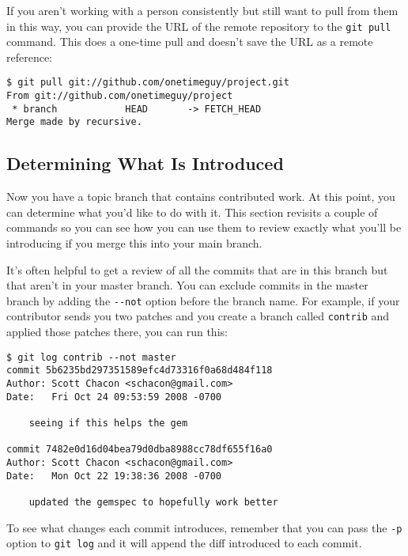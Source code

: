 \documentclass[a4paper]{book}
\begin{document}
If you aren't working with a person consistently but still want to pull from them in this way, you can provide the URL of the remote repository to the \texttt{git pull} command. This does a one-time pull and doesn't save the URL as a remote reference:

\begin{shaded}\begin{verbatim}
$ git pull git://github.com/onetimeguy/project.git
From git://github.com/onetimeguy/project
 * branch            HEAD       -> FETCH_HEAD
Merge made by recursive.
\end{verbatim}\end{shaded}

\subsection{Determining What Is Introduced}\label{determining-what-is-introduced}

Now you have a topic branch that contains contributed work. At this point, you can determine what you'd like to do with it. This section revisits a couple of commands so you can see how you can use them to review exactly what you'll be introducing if you merge this into your main branch.

It's often helpful to get a review of all the commits that are in this branch but that aren't in your master branch. You can exclude commits in the master branch by adding the \texttt{-{}-not} option before the branch name. For example, if your contributor sends you two patches and you create a branch called \texttt{contrib} and applied those patches there, you can run this:

\begin{shaded}\begin{verbatim}
$ git log contrib --not master
commit 5b6235bd297351589efc4d73316f0a68d484f118
Author: Scott Chacon <schacon@gmail.com>
Date:   Fri Oct 24 09:53:59 2008 -0700

    seeing if this helps the gem

commit 7482e0d16d04bea79d0dba8988cc78df655f16a0
Author: Scott Chacon <schacon@gmail.com>
Date:   Mon Oct 22 19:38:36 2008 -0700

    updated the gemspec to hopefully work better
\end{verbatim}\end{shaded}

To see what changes each commit introduces, remember that you can pass the \texttt{-p} option to \texttt{git log} and it will append the diff introduced to each commit.
\end{document}
